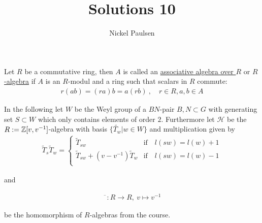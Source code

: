 \documentclass[]{article}
\title{Solutions 10}
\author{Nickel Paulsen}
\begin{document}
\maketitle



\begin{definition*}
   Let \(R\) be a commutative ring, then \(A\) is called an \underline{associative algebra over \(R\)} or \underline{\(R\)-algebra} if \(A\) is an \(R\)-modul and a ring 
   such that scalars in \(R\) commute:
   \begin{align*}
     r ( a b) = (r a) b = a(rb) \ , \quad r \in R, a,b \in A
   \end{align*}
\end{definition*}

In the following let \(W\) be the Weyl group of a \(BN\)-pair \(B,N \subset G\) with generating set \(S \subset W\) which only contains elements
of order \(2\). Furthermore let \(\mathscr{H}\) be the \(R:={\mathbb{Z}}[v,v^{-1}]\)-algebra with basis \(\{\widetilde{T_w} | w \in W\}\) and multiplication given by
\begin{align*}
    \widetilde{T}_{s} \widetilde{T}_w =
    \begin{cases}
        \widetilde{T}_{s w}& \text{if} \quad l(s w) = l(w) +1 \\
        \widetilde{T}_{s w}+(v-v^{-1})\widetilde{T}_w & \text{if} \quad l(s w)= l(w)-1 \\
    \end{cases}
\end{align*}

and 

\begin{align*}
    \overline{\phantom{x}}: R \rightarrow R, \ v \mapsto v^{-1}
\end{align*}

be the homomorphism of \(R\)-algebras from the course. 
\end{document}
